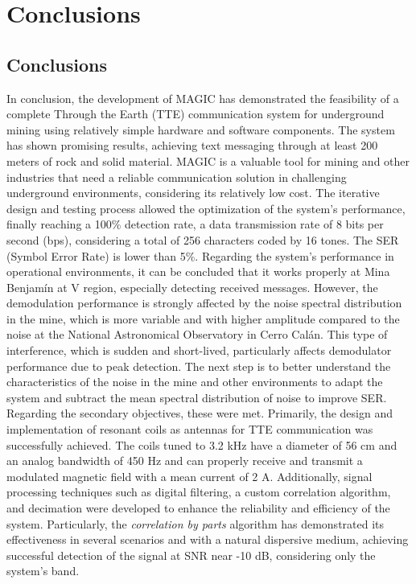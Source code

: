 \chapter{Conclusions}\label{ch:discussion-and-conclusions}


\section{Conclusions}
In conclusion, the development of MAGIC has demonstrated the feasibility of a complete Through the Earth (TTE) communication system for underground mining using relatively simple hardware and software components. The system has shown promising results, achieving text messaging through at least 200 meters of rock and solid material. MAGIC is a valuable tool for mining and other industries that need a reliable communication solution in challenging underground environments, considering its relatively low cost.
\newp
The iterative design and testing process allowed the optimization of the system's performance, finally reaching a 100\% detection rate, a data transmission rate of 8 bits per second (bps), considering a total of 256 characters coded by 16 tones. The SER (Symbol Error Rate) is lower than 5\%.
\newp
Regarding the system's performance in operational environments, it can be concluded that it works properly at Mina Benjamín at V region, especially detecting received messages. However, the demodulation performance is strongly affected by the noise spectral distribution in the mine, which is more variable and with higher amplitude compared to the noise at the National Astronomical Observatory in Cerro Calán. This type of interference, which is sudden and short-lived, particularly affects demodulator performance due to peak detection. The next step is to better understand the characteristics of the noise in the mine and other environments to adapt the system and subtract the mean spectral distribution of noise to improve SER.
\newp
Regarding the secondary objectives, these were met. Primarily, the design and implementation of resonant coils as antennas for TTE communication was successfully achieved. The coils tuned to 3.2 kHz have a diameter of 56 cm and an analog bandwidth of 450 Hz and can properly receive and transmit a modulated magnetic field with a mean current of 2 A. Additionally, signal processing techniques such as digital filtering, a custom correlation algorithm, and decimation were developed to enhance the reliability and efficiency of the system. Particularly, the \textit{correlation by parts} algorithm has demonstrated its effectiveness in several scenarios and with a natural dispersive medium, achieving successful detection of the signal at SNR near  -10 dB, considering only the system's band.
